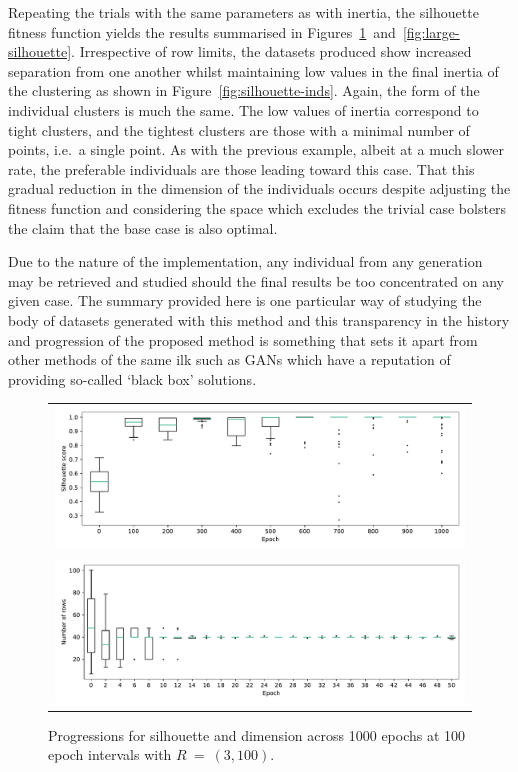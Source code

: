 \documentclass[smallextended]{svjour3}
\newlength{\imgwidth}
\begin{document}
Repeating the trials with the same parameters as with inertia, the silhouette
fitness function yields the results summarised in
Figures~\ref{fig:small-silhouette}~and~\ref{fig:large-silhouette}. Irrespective
of row limits, the datasets produced show increased separation from one another
whilst maintaining low values in the final inertia of the clustering as shown in
Figure~\ref{fig:silhouette-inds}. Again, the form of the individual clusters is
much the same. The low values of inertia correspond to tight clusters, and the
tightest clusters are those with a minimal number of points, i.e.\ a single
point. As with the previous example, albeit at a much slower rate, the
preferable individuals are those leading toward this case. That this gradual
reduction in the dimension of the individuals occurs despite adjusting the
fitness function and considering the space which excludes the trivial case
bolsters the claim that the base case is also optimal.

Due to the nature of the implementation, any individual from any
generation may be retrieved and studied should the final results be too
concentrated on any given case. The summary provided here is one particular way
of studying the body of datasets generated with this method and this
transparency in the history and progression of the proposed method is something
that sets it apart from other methods of the same ilk such as GANs which have a
reputation of providing so-called `black box' solutions.

\addtocounter{figure}{1}
\begin{figure}[htbp]
    \ContinuedFloat%
    \centering
    \begin{tabular}{c}
        \includegraphics[width=\imgwidth]{Fig9a-1.pdf}
        \\
        \includegraphics[width=\imgwidth]{Fig9a-2.pdf}
    \end{tabular}
    \caption{%
        Progressions for silhouette and dimension across 1000 epochs at 100
        epoch intervals with \(R~=~(3, 100)\).
    }\label{fig:small-silhouette}
\end{figure}
\end{document}
